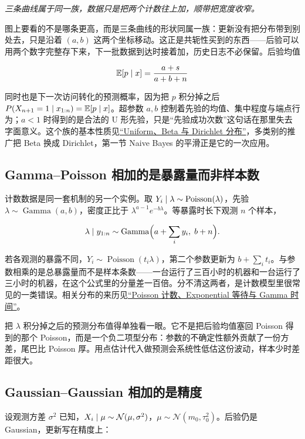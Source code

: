 \emph{三条曲线属于同一族，数据只是把两个计数往上加，顺带把宽度收窄。}

图上要看的不是哪条更高，而是三条曲线的形状同属一族：更新没有把分布带到别处去，只是沿着 \((a,b)\) 这两个坐标移动。这正是共轭性买到的东西——后验可以用两个数字完整存下来，下一批数据到达时接着加，历史日志不必保留。后验均值

\[
\mathbb{E}[p\mid x]=\frac{a+s}{a+b+n}
\]

同时也是下一次访问转化的预测概率，因为把 \(p\) 积分掉之后 \(P(X_{n+1}=1\mid x_{1:n})=\mathbb{E}[p\mid x]\)。超参数 \(a,b\) 控制着先验的均值、集中程度与端点行为；\(a<1\) 时得到的是合法的 U 形先验，只是``先验成功次数''这句话在那里失去字面意义。这个族的基本性质见\hyperref[sec:05-Probability/06-Common-Distributions/04]{``Uniform、Beta 与 Dirichlet 分布''}，多类别的推广把 Beta 换成 Dirichlet，第一节 Naive Bayes 的平滑正是它的一次应用。

\subsection{Gamma--Poisson 相加的是暴露量而非样本数}

计数数据是同一套机制的另一个实例。取 \(Y_i\mid\lambda\sim\operatorname{Poisson}(\lambda)\)，先验 \(\lambda\sim\operatorname{Gamma}(a,b)\)，密度正比于 \(\lambda^{a-1}e^{-b\lambda}\)。等暴露时长下观测 \(n\) 个样本，

\[
\lambda\mid y_{1:n}\sim\operatorname{Gamma}\Bigl(a+\sum_iy_i,\;b+n\Bigr).
\]

若各观测的暴露不同，\(Y_i\sim\operatorname{Poisson}(t_i\lambda)\)，第二个参数更新为 \(b+\sum_it_i\)。与参数相乘的是总暴露量而不是样本条数——一台运行了三百小时的机器和一台运行了三小时的机器，在这个公式里的分量差一百倍。分不清这两者，是计数模型里很常见的一类错误。相关分布的来历见\hyperref[sec:05-Probability/06-Common-Distributions/03]{``Poisson 计数、Exponential 等待与 Gamma 时间''}。

把 \(\lambda\) 积分掉之后的预测分布值得单独看一眼。它不是把后验均值塞回 Poisson 得到的那个 Poisson，而是一个负二项型分布：参数的不确定性额外贡献了一份方差，尾巴比 Poisson 厚。用点估计代入做预测会系统性低估这份波动，样本少时差距很大。

\subsection{Gaussian--Gaussian 相加的是精度}

设观测方差 \(\sigma^2\) 已知，\(X_i\mid\mu\sim\mathcal N(\mu,\sigma^2)\)，\(\mu\sim\mathcal N(m_0,\tau_0^2)\)。后验仍是 Gaussian，更新写在精度上：


